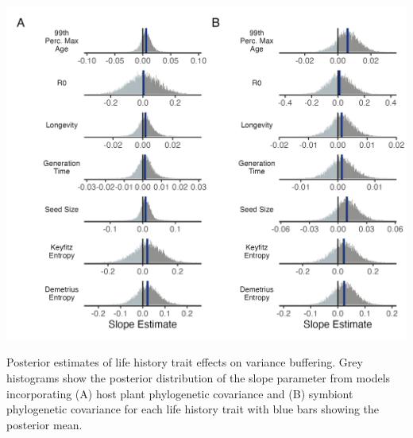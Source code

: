 \documentclass[lineno, sn-basic]{sn-jnl}%
\begin{document}
\begin{myfigure}[H]
	\centering
	\includegraphics[width=\linewidth]{lh_slopes_plot.png}
	\caption[Posterior estimates of life history trait effects on variance buffering]{Posterior estimates of life history trait effects on variance buffering. Grey histograms show the posterior distribution of the slope parameter from models incorporating (A) host plant phylogenetic covariance and (B) symbiont phylogenetic covariance for each life history trait with blue bars showing the posterior mean.}
\end{myfigure}
\end{document}
